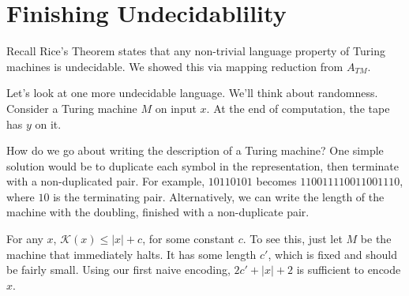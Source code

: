 


\section*{Finishing Undecidablility}

Recall Rice's Theorem states that any non-trivial language property of Turing machines is undecidable.  We showed this via mapping reduction from $A_{TM}$. 

Let's look at one more undecidable language.  We'll think about randomness.  Consider a Turing machine $M$ on input $x$.  At the end of computation, the tape has $y$ on it.  


How do we go about writing the description of a Turing machine?  One simple solution would be to duplicate each symbol in the representation, then terminate with a non-duplicated pair.  For example, $10110101$ becomes $110011110011001110$, where $10$ is the terminating pair.  Alternatively, we can write the length of the machine with the doubling, finished with a non-duplicate pair. 

For any $x$, $\mathcal{K}(x) \leq |x| + c$, for some constant $c$.  To see this, just let $M$ be the machine that immediately halts.  It has some length $c'$, which is fixed and should be fairly small.  Using our first naive encoding, $2c' + |x| + 2$ is sufficient to encode $x$.




